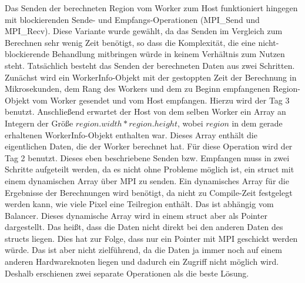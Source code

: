 Das Senden der berechneten Region vom Worker zum Host funktioniert hingegen mit blockierenden
Sende- und Empfangs-Operationen (MPI\_Send und MPI\_Recv).
Diese Variante wurde gewählt, da das Senden im Vergleich zum Berechnen sehr wenig Zeit benötigt, so dass die Komplexität, die eine
nicht-blockierende Behandlung mitbringen würde in keinem Verhältnis zum Nutzen steht.
Tatsächlich besteht das Senden der berechneten Daten aus zwei Schritten.
Zunächst wird ein WorkerInfo-Objekt mit der gestoppten Zeit der Berechnung in Mikrosekunden, dem Rang des
Workers und dem zu Beginn empfangenen Region-Objekt vom Worker gesendet und vom Host
empfangen. Hierzu wird der Tag 3 benutzt.
Anschließend erwartet der Host von dem selben Worker ein Array an Integern der Größe
$region.width * region.height$, wobei $region$ in dem gerade erhaltenen WorkerInfo-Objekt enthalten war.
Dieses Array enthält die eigentlichen Daten, die der Worker berechnet hat. Für diese Operation wird der
Tag 2 benutzt.
Dieses eben beschriebene Senden bzw. Empfangen muss in zwei Schritte aufgeteilt werden, da es nicht
ohne Probleme möglich ist, ein struct mit einem dynamischen Array über MPI zu senden. Ein dynamisches
Array für die Ergebnisse der Berechnungen wird benötigt, da nicht zu Compile-Zeit festgelegt werden
kann, wie viele Pixel eine Teilregion enthält. Das ist abhängig vom Balancer. Dieses dynamische Array wird
in einem struct aber als Pointer dargestellt. Das heißt, dass die Daten nicht direkt bei den anderen Daten
des structs liegen. Dies hat zur Folge, dass nur ein Pointer mit MPI geschickt werden würde. Das ist aber
nicht zielführend, da die Daten ja immer noch auf einem anderen Hardwareknoten liegen und dadurch ein
Zugriff nicht möglich wird. Deshalb erschienen zwei separate Operationen als die beste Lösung.


